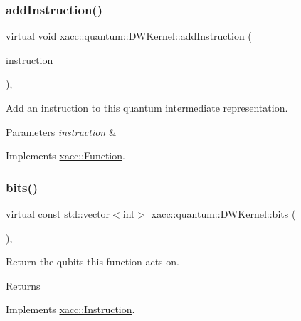\subsubsection{\texorpdfstring{add\+Instruction()}{addInstruction()}}
{\footnotesize\ttfamily virtual void xacc\+::quantum\+::\+D\+W\+Kernel\+::add\+Instruction (\begin{DoxyParamCaption}\item[{Inst\+Ptr}]{instruction }\end{DoxyParamCaption})\hspace{0.3cm}{\ttfamily [inline]}, {\ttfamily [virtual]}}

Add an instruction to this quantum intermediate representation.


\begin{DoxyParams}{Parameters}
{\em instruction} & \\
\hline
\end{DoxyParams}


Implements \hyperlink{a01151_aa8c9ec2d08be75c69399d4254b0216f5}{xacc\+::\+Function}.

\mbox{\label{a00983_adae68964db6acd8b4c2267c270a8ec58}} 
\subsubsection{\texorpdfstring{bits()}{bits()}}
{\footnotesize\ttfamily virtual const std\+::vector$<$int$>$ xacc\+::quantum\+::\+D\+W\+Kernel\+::bits (\begin{DoxyParamCaption}{ }\end{DoxyParamCaption})\hspace{0.3cm}{\ttfamily [inline]}, {\ttfamily [virtual]}}

Return the qubits this function acts on. \begin{DoxyReturn}{Returns}

\end{DoxyReturn}


Implements \hyperlink{a01155_a819f32e94c3e1c9e69a0061aaf8d86dc}{xacc\+::\+Instruction}.

\mbox{\label{a00983_a09ffac417d4ecbbd82d7a680ad8dfcce}} 
